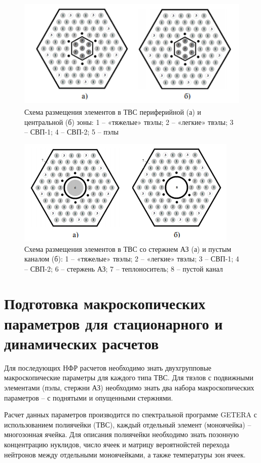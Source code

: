 \begin{figure}[!h]
\center
\includegraphics[width=4.59375in,height=2.10972in]{media/image13.png}
\caption{Схема размещения элементов в ТВС периферийной (а) и
центральной (б) зоны: 1 -- «тяжелые» твэлы; 2 -- «легкие» твэлы; 3 --
СВП-1; 4 -- СВП-2; 5 -- пэлы}
\end{figure}

\begin{figure}[!h]
\center
\includegraphics[width=4.15625in,height=2.00000in]{media/image14.png}
\caption{Схема размещения элементов в ТВС со стержнем АЗ (а) и
пустым каналом (б): 1 -- «тяжелые» твэлы; 2 -- «легкие» твэлы; 3 --
СВП-1; 4 -- СВП-2; 6 -- стержень АЗ; 7 -- теплоноситель; 8 -- пустой
канал}
\end{figure}

\section{Подготовка макроскопических параметров для стационарного и
динамических расчетов}


Для последующих НФР расчетов необходимо знать двухгрупповые
макроскопические параметры для каждого типа ТВС. Для твэлов с подвижными
элементами (пэлы, стержни АЗ) необходимо знать два набора
макроскопических параметров -- с поднятыми и опущенными стержнями.

Расчет данных параметров производится по спектральной программе GETERA с
использованием полиячейки (ТВС), каждый отдельный элемент (моноячейка)
-- многозонная ячейка. Для описания полиячейки необходимо знать позонную
концентрацию нуклидов, число ячеек и матрицу вероятнойстей перехода
нейтронов между отдельными моноячейками, а также температуры зон ячеек.


